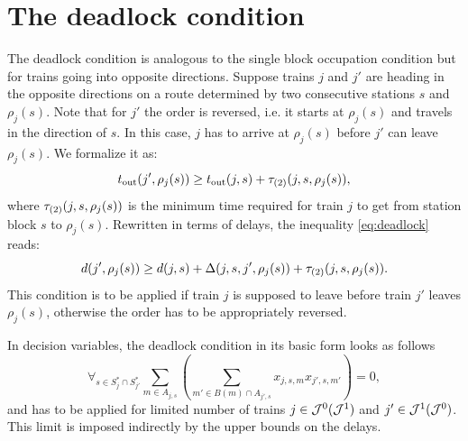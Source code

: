 \section{The deadlock condition}
The deadlock condition is analogous to the single block occupation condition
but for trains going into opposite directions. Suppose trains $j$ and $j'$ are
heading in the opposite directions on a route determined by two consecutive
stations $s$ and $\rho_j(s)$. Note that for $j'$ the order is reversed, i.e. it
starts at $\rho_j(s)$ and travels in the direction of $s$. In this case, $j$
has to arrive at $\rho_j(s)$ before $j'$ can leave $\rho_j(s)$. We formalize it
as:
\begin{equation}
  \label{eq:deadlock}
  t_\text{out}(j', \rho_j(s)) \ge t_\text{out}(j,s) + \tau_{(2)}(j, s, \rho_j(s)),
\end{equation}
where $\tau_{(2)}(j, s, \rho_j(s))$ is the minimum time required for train $j$ to
get from station block $s$ to $\rho_{j}(s)$. Rewritten in terms of delays, the
inequality \eqref{eq:deadlock} reads:
\begin{equation}
  \label{eq:deadlock2}
  d(j',\rho_j(s)) \ge d(j, s) + \Delta(j,s,j',\rho_j(s)) + \tau_{(2)}(j, s, \rho_j(s)).
\end{equation}
This condition is to be applied if train $j$ is supposed to leave before train
$j'$ leaves $\rho_{j}(s)$, otherwise the order has to be appropriately
reversed.

In decision variables, the deadlock condition in its basic form looks as
follows
\begin{equation}
  \label{eq:qubo:deadlock}
  \forall_{s \in S^{*}_{j} \cap S^{*}_{j'}} \sum_{m \in A_{j, s}} \left(
  \sum_{m' \in B(m) \cap A_{j', s}} x_{j,s,m}x_{j',s,m'}
  \right) = 0,
\end{equation}
and has to be applied for limited number of trains $j \in \mathcal{J}^{0} (\mathcal{J}^{1})$
and $j' \in \mathcal{J}^{1}(\mathcal{J}^{0})$. This limit is imposed indirectly by the upper
bounds on the delays.
